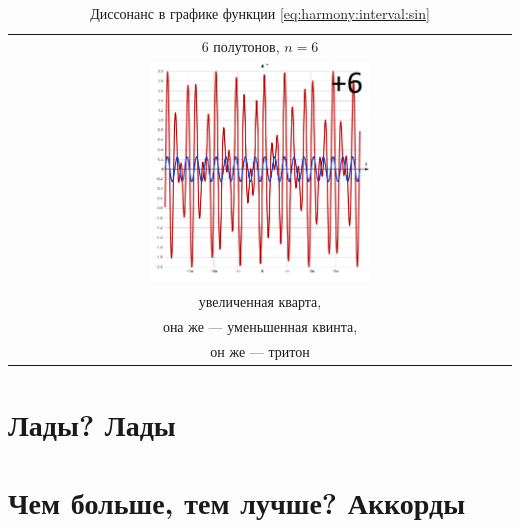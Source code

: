 \begin{table}[!ht]
    \caption{Диссонанс в графике функции \ref{eq:harmony:interval:sin}}
    \label{t:harmony:interval:disso-6}
    \centering
    \begin{tabular}{c}
        \hline\hline
        6 полутонов, $n=6$ \\
        \includegraphics[width=0.45\textwidth]{fig/intervals/i06} \\
        увеличенная кварта,\\
        она же --- уменьшенная квинта,\\
        он же --- тритон\\
        \hline\hline
    \end{tabular}
\end{table}


\section{Лады? Лады}
\label{ch:harmony:lad}


\section{Чем больше, тем лучше? Аккорды}
\label{ch:harmony:chords}


